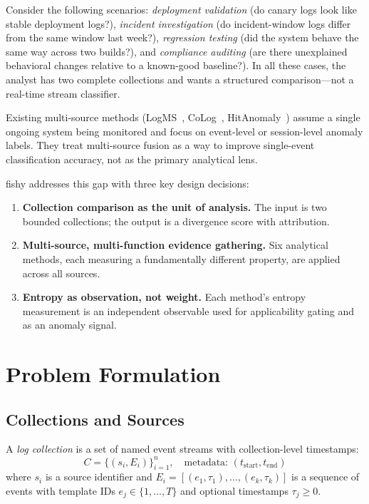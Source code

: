 \documentclass[10pt,twocolumn]{article}
\begin{document}
Consider the following scenarios: \textit{deployment validation} (do canary logs look like stable deployment logs?), \textit{incident investigation} (do incident-window logs differ from the same window last week?), \textit{regression testing} (did the system behave the same way across two builds?), and \textit{compliance auditing} (are there unexplained behavioral changes relative to a known-good baseline?). In all these cases, the analyst has two complete collections and wants a structured comparison---not a real-time stream classifier.

Existing multi-source methods (LogMS~\cite{logms}, CoLog~\cite{colog}, HitAnomaly~\cite{hitanomaly}) assume a single ongoing system being monitored and focus on event-level or session-level anomaly labels. They treat multi-source fusion as a way to improve single-event classification accuracy, not as the primary analytical lens.

fishy addresses this gap with three key design decisions:
\begin{enumerate}[leftmargin=*,topsep=2pt,itemsep=1pt]
  \item \textbf{Collection comparison as the unit of analysis.} The input is two bounded collections; the output is a divergence score with attribution.
  \item \textbf{Multi-source, multi-function evidence gathering.} Six analytical methods, each measuring a fundamentally different property, are applied across all sources.
  \item \textbf{Entropy as observation, not weight.} Each method's entropy measurement is an independent observable used for applicability gating and as an anomaly signal.
\end{enumerate}

\section{Problem Formulation}

\subsection{Collections and Sources}

A \textit{log collection} is a set of named event streams with collection-level timestamps:
\[
C = \{(s_i, E_i)\}_{i=1}^{n}, \quad \text{metadata: } (t_{\text{start}}, t_{\text{end}})
\]
where $s_i$ is a source identifier and $E_i = [(e_1, \tau_1), \ldots, (e_k, \tau_k)]$ is a sequence of events with template IDs $e_j \in \{1, \ldots, T\}$ and optional timestamps $\tau_j \geq 0$.
\end{document}
